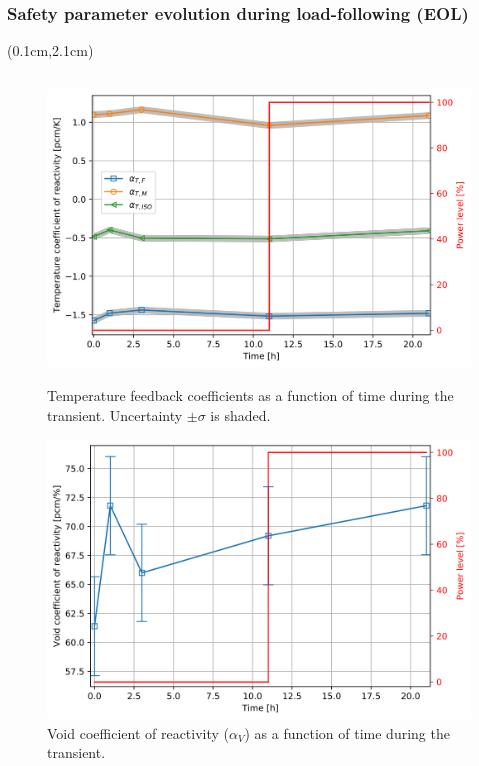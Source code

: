 \begin{frame}
\frametitle{Safety parameter evolution during load-following (EOL)}
\begin{textblock*}{12.5cm}(0.1cm,2.1cm) %
	\begin{columns}
		\column[t]{6.3cm}
		\begin{figure}[t]
			\begin{overprint}
	\includegraphics[width=1.15\linewidth]{../dissertation/figures/ch5/saf_par/tc_evo.png}
	\vspace{-6mm}
	\caption{Temperature feedback coefficients as a function of time during 
	the transient. 
	Uncertainty $\pm\sigma$ is shaded.}
	\includegraphics[width=1.15\linewidth]{../dissertation/figures/ch5/saf_par/void_evo.png}
	\vspace{-6mm}
	\caption{Void coefficient of reactivity ($\alpha_V$) as a function of time 
	during the transient.}

\end{overprint}
\end{figure}
\end{columns}
\end{textblock*}
\end{frame}
